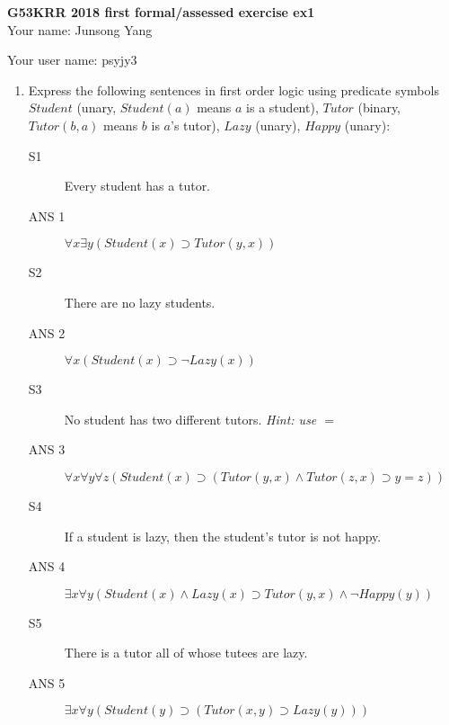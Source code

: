 \documentclass{article}
\begin{document}
{\bf G53KRR 2018 first formal/assessed exercise ex1}\\

Your name: Junsong Yang

Your user name: psyjy3


\begin{enumerate}
\item Express the following sentences in first order logic using predicate
symbols $Student$ (unary, $Student(a)$ means $a$ is a student), $Tutor$ (binary,
$Tutor(b,a)$ means $b$ is $a$'s tutor), $Lazy$ (unary), $Happy$ (unary):

\begin{description}
\item[S1] Every student has a tutor.
\item[ANS 1] $\forall x \exists y (Student(x) \supset Tutor(y,x)) $ 
\item[S2] There are no lazy students.
\item[ANS 2] $\forall x (Student(x) \supset \neg Lazy(x)) $
\item[S3] No student has two different tutors. \emph{Hint: use $=$}
\item[ANS 3] $\forall x \forall y \forall z (Student(x) \supset ( Tutor(y,x) \wedge Tutor(z,x) \supset y = z )) $
\item[S4] If a student is lazy, then the student's tutor is not happy.
\item[ANS 4] $\exists x \forall y (Student(x) \wedge Lazy(x) \supset Tutor(y,x) \wedge \neg Happy(y) ) $
\item[S5] There is a tutor all of whose tutees are lazy.
\item[ANS 5] $\exists x \forall y (Student(y) \supset (Tutor(x,y) \supset Lazy(y) )) $
\end{description}


\end{enumerate}
\end{document}
